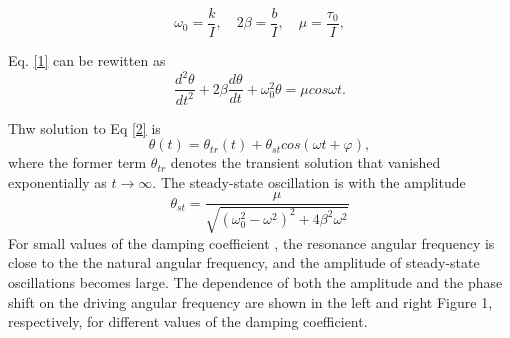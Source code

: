 \[
\omega_0=\frac{k}{I},\quad 2\beta=\frac{b}{I}, \quad \mu=\frac{\tau_0}{I}, 
\]

Eq. \ref{1} can be rewitten as
\begin{equation}
\label{2}
\frac{d^2\theta}{dt^2}+2\beta\frac{d\theta}{dt}+\omega_0^2\theta
=\mu cos\omega t.
\end{equation}

Thw solution to Eq \ref{2} is
\[
\theta(t)=\theta_{tr}(t)+\theta_{st}cos(\omega t+\varphi),
\]
where the former term $\theta_{tr}$ denotes the transient solution that vanished
exponentially as $t\rightarrow \infty$. The steady-state  oscillation is with
the amplitude 
\[
\theta_{st}=\frac{\mu}{\sqrt{(\omega_0^2-\omega^2)^2+4\beta^2\omega^2}}
\]
For small values of the damping coefficient \beta, the resonance angular
frequency is close to the the natural angular frequency, and the amplitude of
steady-state oscillations becomes large. The dependence of both the amplitude
and the phase shift on the driving angular frequency are shown in the left and
right Figure 1, respectively, for different values of the damping coefficient.